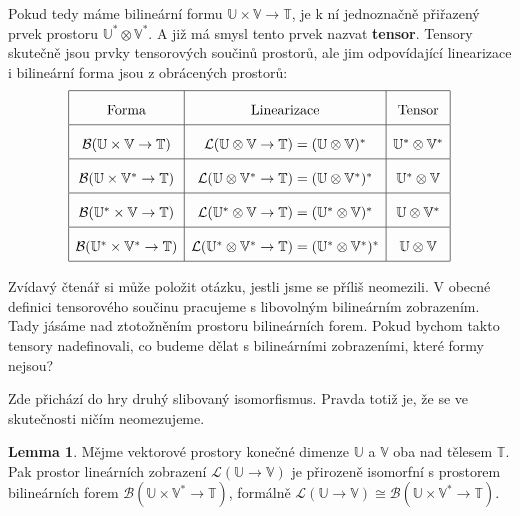 \documentclass[a5paper,12pt]{amsbook}
\theoremstyle{definition}
\newtheorem{lemma}[theorem]{Lemma}
\newcommand{\myspace}[1]{\mathbb{#1}}
\begin{document}
Pokud tedy máme bilineární formu $\myspace{U}\times\myspace{V}\rightarrow\myspace{T}$,
je k ní jednoznačně přiřazený prvek prostoru $\myspace{U}^*\otimes\myspace{V}^*$. A
již má smysl tento prvek nazvat \textbf{tensor}. Tensory skutečně jsou prvky tensorových
součinů prostorů, ale jim odpovídající linearizace i bilineární forma jsou z obrácených
prostorů:
\begin{equation*}
\def\arraystretch{2.0}
\begin{array}{|c|c|c|}
\hline
\text{Forma} & \text{Linearizace} & \text{Tensor} \\
\hline
\mathcal{B}(\myspace{U}\times\myspace{V}\rightarrow\myspace{T}) &
\mathcal{L}(\myspace{U}\otimes\myspace{V}\rightarrow\myspace{T}) = (\myspace{U}\otimes\myspace{V})^* &
\myspace{U^*}\otimes\myspace{V^*} \\
\hline
\mathcal{B}(\myspace{U}\times\myspace{V^*}\rightarrow\myspace{T}) &
\mathcal{L}(\myspace{U}\otimes\myspace{V^*}\rightarrow\myspace{T}) = (\myspace{U}\otimes\myspace{V^*})^* &
\myspace{U^*}\otimes\myspace{V} \\
\hline
\mathcal{B}(\myspace{U^*}\times\myspace{V}\rightarrow\myspace{T}) &
\mathcal{L}(\myspace{U^*}\otimes\myspace{V}\rightarrow\myspace{T}) = (\myspace{U^*}\otimes\myspace{V})^* &
\myspace{U}\otimes\myspace{V^*} \\
\hline
\mathcal{B}(\myspace{U^*}\times\myspace{V^*}\rightarrow\myspace{T}) &
\mathcal{L}(\myspace{U^*}\otimes\myspace{V^*}\rightarrow\myspace{T}) = (\myspace{U^*}\otimes\myspace{V^*})^* &
\myspace{U}\otimes\myspace{V} \\
\hline
\end{array}
\end{equation*}

\medskip\noindent
Zvídavý čtenář si může položit otázku, jestli jsme se příliš neomezili. V obecné definici tensorového
součinu pracujeme s libovolným bilineárním zobrazením. Tady jásáme nad ztotožněním prostoru bilineárních
forem. Pokud bychom takto tensory nadefinovali, co budeme dělat s bilineárními zobrazeními, které formy
nejsou?

Zde přichází do hry druhý slibovaný isomorfismus. Pravda totiž je, že se ve skutečnosti ničím neomezujeme.

\begin{lemma}
Mějme vektorové prostory konečné dimenze $\myspace{U}$ a $\myspace{V}$ oba nad tělesem $\myspace{T}$.
Pak prostor lineárních zobrazení $\mathcal{L}(\myspace{U}\rightarrow\myspace{V})$ je 
přirozeně isomorfní s prostorem bilineárních forem
$\mathcal{B}(\myspace{U}\times\myspace{V^*}\rightarrow\myspace{T})$, formálně
$\mathcal{L}(\myspace{U}\rightarrow\myspace{V})\cong
\mathcal{B}(\myspace{U}\times\myspace{V^*}\rightarrow\myspace{T})$.
\end{lemma}
\end{document}
